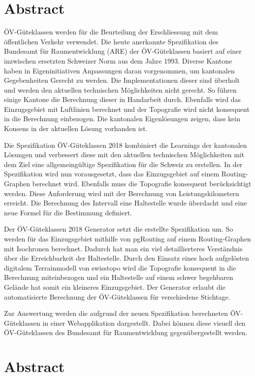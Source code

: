 
\chapter*{Abstract}
ÖV-Güteklassen werden für die Beurteilung der Erschliessung mit dem öffentlichen Verkehr verwendet.
Die heute anerkannte Spezifikation des Bundesamt für Raumentwicklung (ARE) der ÖV-Güteklassen basiert auf einer inzwischen ersetzten Schweizer Norm aus dem Jahre 1993.
Diverse Kantone haben in Eigeninitiativen Anpassungen daran vorgenommen, um kantonalen Gegebenheiten Gerecht zu werden.
Die Implementationen dieser sind überholt und werden den aktuellen technischen Möglichkeiten nicht gerecht.
So führen einige Kantone die Berechnung dieser in Handarbeit durch.
Ebenfalls wird das Einzugsgebiet mit Luftlinien berechnet und der Topografie wird nicht konsequent in die Berechnung einbezogen.
Die kantonalen Eigenlösungen zeigen, dass kein Konsens in der aktuellen Lösung vorhanden ist.

Die Spezifikation ÖV-Güteklassen 2018 kombiniert die Learnings der kantonalen Lösungen und verbessert diese mit den aktuellen technischen Möglichkeiten mit dem Ziel eine allgemeingültige Spezifikation für die Schweiz zu erstellen.
In der Spezifikation wird nun vorausgesetzt, dass das Einzugsgebiet auf einem Routing-Graphen berechnet wird.
Ebenfalls muss die Topografie konsequent berücksichtigt werden.
Diese Anforderung wird mit der Berechnung von Leistungskilometern erreicht.
Die Berechnung des Intervall eine Haltestelle wurde überdacht und eine neue Formel für die Bestimmung definiert.

Der ÖV-Güteklassen 2018 Generator setzt die erstellte Spezifikation um.
So werden für das Einzugsgebiet mithilfe von pgRouting auf einem Routing-Graphen mit Isochronen berechnet.
Dadurch hat man ein viel detaillierteres Verständnis über die Erreichbarkeit der Haltestelle.
Durch den Einsatz eines hoch aufgelösten digitalem Terrainmodell von swisstopo wird die Topografie konsequent in die Berechnung miteinbezogen und ein Haltestelle auf einem schwer begehbaren Gelände hat somit ein kleineres Einzugsgebiet.
Der Generator erlaubt die automatisierte Berechnung der ÖV-Güteklassen für verschiedene Stichtage.

Zur Auswertung werden die aufgrund der neuen Spezifikation berechneten ÖV-Güteklassen in einer Webapplikation dargestellt.
Dabei können diese visuell den ÖV-Güteklassen des Bundesamt für Raumentwicklung gegenübergestellt werden.




\cleardoublepage

\chapter*{Abstract}


